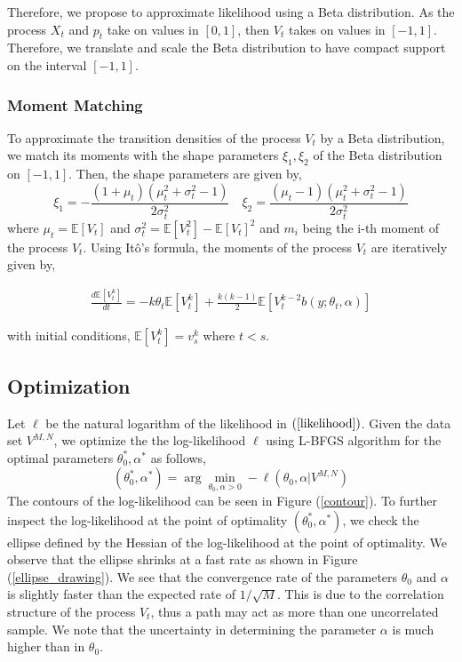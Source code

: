 \documentclass[10pt,twocolumn,letterpaper]{article}
\newcommand{\E}{\mathbb{E}}
\begin{document}
Therefore, we propose to approximate likelihood using a Beta distribution. As the process $X_t$ and $p_t$ take on values in $[0,1]$, then $V_t$ takes on values in $[-1,1]$. Therefore, we translate and scale the Beta distribution to have compact support on the interval $[-1,1]$.


\subsubsection*{ Moment Matching}
To approximate the transition densities of  the process $V_t$ by a Beta distribution, we match its moments with the shape parameters $\xi_1, \xi_2$ of the Beta distribution on $[-1,1]$.  Then, the shape parameters are given by,
\begin{equation}
\xi_1 = - \frac{(1+\mu_t )(\mu_t^2 + \sigma_t^2 -1)}{2 \sigma_t^2} \quad \xi_2=  \frac{(\mu_t-1 )(\mu_t^2 + \sigma_t^2 -1)}{2 \sigma_t^2} \label{param_transformed_beta}
\end{equation}
where $\mu_t = \E[ V_t]$ and $\sigma_t^2= \E[ V^2_t]- \E[ V_t]^2$ and $m_i$ being the i-th moment of the process $V_t$. Using It\^{o}'s formula, the moments  of the  process $V_t$ are iteratively given by,

\begin{equation}
\begin{split}
\frac{d \E[ V^k_t]}{dt} = - k \theta_t \E [ V^k_t] + \frac{k(k-1)}{2} \E [ V^{k-2}_t  b(y;\theta_t, \alpha)]
\end{split}
\end{equation}

with initial conditions, $\E[ V^k_t]= v_{s}^k$ where $t<s$.
\subsection{Optimization}
Let $\ell$ be the natural logarithm  of the likelihood in $(\ref{likelihood})$. Given the data set $V^{M,N}$, we  optimize the the log-likelihood $\ell$  using L-BFGS algorithm  for the optimal parameters $\theta_0^* , \alpha^*$ as follows,
\begin{equation}
(\theta_0^* , \alpha^* ) = \arg \underset{\theta_0, \alpha>0}{\min} - \ell( \theta_0,  \alpha | V^{M,N} )
\end{equation}
The contours of the  log-likelihood can be seen in Figure (\ref{contour}). To further inspect the log-likelihood at the point of optimality $(\theta_0^* , \alpha^* )$, we check the ellipse defined by the  Hessian of the log-likelihood at the point of optimality.  We observe that the ellipse shrinks at a fast rate as shown in Figure (\ref{ellipse_drawing}). We see that  the convergence rate of the parameters $\theta_0$ and $\alpha$ is slightly faster than the expected rate of $1/\sqrt{M}$. This is due to the correlation structure of the process $V_t$, thus a path may act  as more than one  uncorrelated sample. We note that the uncertainty in determining the parameter $\alpha$  is much higher than  in $\theta_0$.
\end{document}
